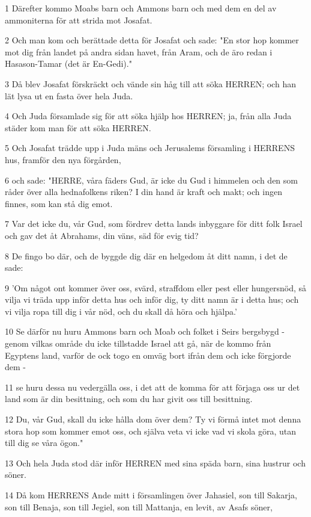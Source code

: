 \par 1 Därefter kommo Moabs barn och Ammons barn och med dem en del av ammoniterna för att strida mot Josafat.
\par 2 Och man kom och berättade detta för Josafat och sade: "En stor hop kommer mot dig från landet på andra sidan havet, från Aram, och de äro redan i Hasason-Tamar (det är En-Gedi)."
\par 3 Då blev Josafat förskräckt och vände sin håg till att söka HERREN; och han lät lysa ut en fasta över hela Juda.
\par 4 Och Juda församlade sig för att söka hjälp hos HERREN; ja, från alla Juda städer kom man för att söka HERREN.
\par 5 Och Josafat trädde upp i Juda mäns och Jerusalems församling i HERRENS hus, framför den nya förgården,
\par 6 och sade: "HERRE, våra fäders Gud, är icke du Gud i himmelen och den som råder över alla hednafolkens riken? I din hand är kraft och makt; och ingen finnes, som kan stå dig emot.
\par 7 Var det icke du, vår Gud, som fördrev detta lands inbyggare för ditt folk Israel och gav det åt Abrahams, din väns, säd för evig tid?
\par 8 De fingo bo där, och de byggde dig där en helgedom åt ditt namn, i det de sade:
\par 9 'Om något ont kommer över oss, svärd, straffdom eller pest eller hungersnöd, så vilja vi träda upp inför detta hus och inför dig, ty ditt namn är i detta hus; och vi vilja ropa till dig i vår nöd, och du skall då höra och hjälpa.'
\par 10 Se därför nu huru Ammons barn och Moab och folket i Seirs bergsbygd - genom vilkas område du icke tillstadde Israel att gå, när de kommo från Egyptens land, varför de ock togo en omväg bort ifrån dem och icke förgjorde dem -
\par 11 se huru dessa nu vedergälla oss, i det att de komma för att förjaga oss ur det land som är din besittning, och som du har givit oss till besittning.
\par 12 Du, vår Gud, skall du icke hålla dom över dem? Ty vi förmå intet mot denna stora hop som kommer emot oss, och själva veta vi icke vad vi skola göra, utan till dig se våra ögon."
\par 13 Och hela Juda stod där inför HERREN med sina späda barn, sina hustrur och söner.
\par 14 Då kom HERRENS Ande mitt i församlingen över Jahasiel, son till Sakarja, son till Benaja, son till Jegiel, son till Mattanja, en levit, av Asafs söner,
